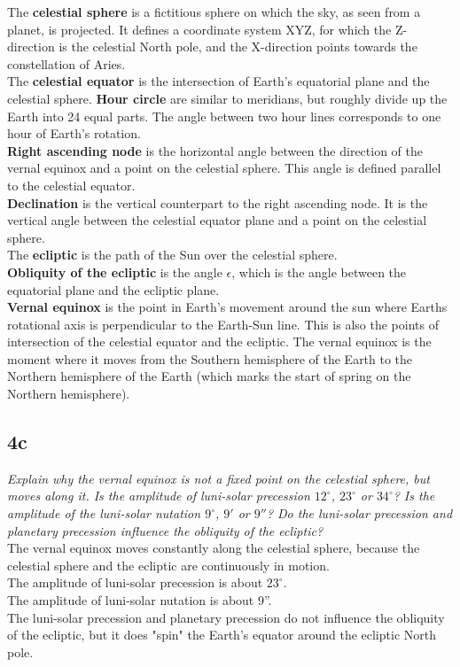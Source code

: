 The \textbf{celestial sphere} is a fictitious sphere on which the sky, as seen from a planet, is projected. It defines a coordinate system XYZ, for which the Z-direction is the celestial North pole, and the X-direction points towards the constellation of Aries. \\
The \textbf{celestial equator} is the intersection of Earth's equatorial plane and the celestial sphere.
\textbf{Hour circle} are similar to meridians, but roughly divide up the Earth into 24 equal parts. The angle between two hour lines corresponds to one hour of Earth's rotation.\\
\textbf{Right ascending node} is the horizontal angle between the direction of the vernal equinox and a point on the celestial sphere. This angle is defined parallel to the celestial equator. \\
\textbf{Declination} is the vertical counterpart to the right ascending node. It is the vertical angle between the celestial equator plane and a point on the celestial sphere.\\
The \textbf{ecliptic} is the path of the Sun over the celestial sphere.\\
\textbf{Obliquity of the ecliptic} is the angle $\epsilon$, which is the angle between the equatorial plane and the ecliptic plane.\\
\textbf{Vernal equinox} is the point in Earth's movement around the sun where Earths rotational axis is perpendicular to the Earth-Sun line. This is also the points of intersection of the celestial equator and the ecliptic. The vernal equinox is the moment where it moves from the Southern hemisphere of the Earth to the Northern hemisphere of the Earth (which marks the start of spring on the Northern hemisphere).\\


\subsection{4c}
\textit{Explain why the vernal equinox is not a fixed point on the celestial sphere, but moves along it. Is the amplitude of luni-solar precession $12^\circ$, $23^\circ$ or $34^\circ$? Is the amplitude of the luni-solar nutation $9^\circ$, $9'$ or $9''$? Do the luni-solar precession and planetary precession influence the obliquity of the ecliptic?} \\
The vernal equinox moves constantly along the celestial sphere, because the celestial sphere and the ecliptic are continuously in motion. \\
The amplitude of luni-solar precession is about $23^\circ$. \\
The amplitude of luni-solar nutation is about 9''. \\
The luni-solar precession and planetary precession do not influence the obliquity of the ecliptic, but it does "spin" the Earth's equator around the ecliptic North pole. \\



